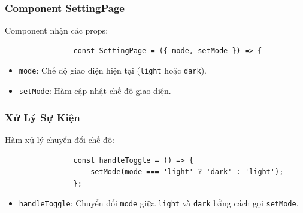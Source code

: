             \subsubsection{Component SettingPage}
                \hspace*{0.6cm}Component nhận các props:
                \begin{lstlisting}
                const SettingPage = ({ mode, setMode }) => {
                \end{lstlisting}
                \begin{itemize}
                    \item \texttt{mode}: Chế độ giao diện hiện tại (\texttt{light} hoặc \texttt{dark}).
                    \item \texttt{setMode}: Hàm cập nhật chế độ giao diện.
                \end{itemize}

            \subsubsection{Xử Lý Sự Kiện}
                \hspace*{0.6cm}Hàm xử lý chuyển đổi chế độ:
                \begin{lstlisting}
                const handleToggle = () => {
                    setMode(mode === 'light' ? 'dark' : 'light');
                };
                \end{lstlisting}
                \begin{itemize}
                    \item \texttt{handleToggle}: Chuyển đổi \texttt{mode} giữa \texttt{light} và \texttt{dark} bằng cách gọi \texttt{setMode}.
                \end{itemize}

